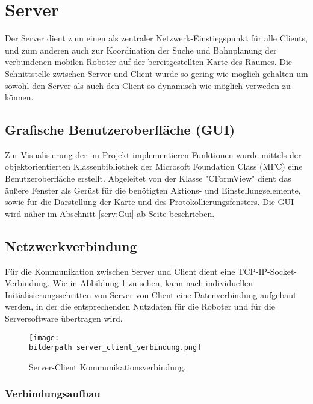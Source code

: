 \def\bilderpath{bilder/}

\section{Server}\label{serv:Server}

Der Server dient zum einen als zentraler Netzwerk-Einstiegspunkt für alle
Clients, und zum anderen auch zur Koordination der Suche und Bahnplanung der verbundenen mobilen Roboter auf der bereitgestellten Karte des Raumes. Die Schnittstelle zwischen Server und Client wurde so gering wie möglich gehalten um sowohl den Server als auch den Client so dynamisch wie möglich verweden zu können.

\subsection{Grafische Benutzeroberfläche (GUI)}\label{serv:archGui}
Zur Visualisierung der im Projekt implementieren Funktionen wurde
mittels der objektorientierten Klassenbibliothek der Microsoft
Foundation Class (MFC) eine Benutzeroberfläche erstellt. Abgeleitet
von der Klasse "CFormView" dient das äußere Fenster als Gerüst für die
benötigten Aktions- und Einstellungselemente, sowie für die
Darstellung der Karte und des Protokollierungsfensters.  Die GUI wird
näher im Abschnitt \ref{serv:Gui} ab Seite \pageref{serv:Gui} beschrieben.
\subsection{Netzwerkverbindung}\label{serv:netzwerkverbindung}
Für die Kommunikation zwischen Server und Client dient eine TCP-IP-Socket-Verbindung. Wie in Abbildung \ref{serv:fig:netzwerkverbindung} zu sehen, kann nach individuellen Initialisierungsschritten von Server von Client eine Datenverbindung aufgebaut werden, in der die entsprechenden Nutzdaten für die Roboter und für die Serversoftware übertragen wird.

\begin{figure}[h]
	\centering	
	\texttt{[image: \\bilderpath server\_client\_verbindung.png]}
	\caption{Server-Client Kommunikationsverbindung.}
	\label{serv:fig:netzwerkverbindung}
\end{figure}

\subsubsection{Verbindungsaufbau}


